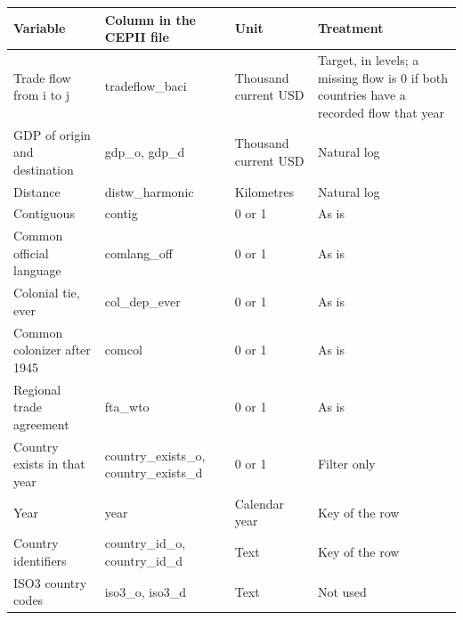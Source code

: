 \begin{tabular}{llll}
\toprule
Variable & Column in the CEPII file & Unit & Treatment \\
\midrule
Trade flow from i to j & tradeflow\_baci & Thousand current USD & Target, in levels; a missing flow is 0 if both countries have a recorded flow that year \\
GDP of origin and destination & gdp\_o, gdp\_d & Thousand current USD & Natural log \\
Distance & distw\_harmonic & Kilometres & Natural log \\
Contiguous & contig & 0 or 1 & As is \\
Common official language & comlang\_off & 0 or 1 & As is \\
Colonial tie, ever & col\_dep\_ever & 0 or 1 & As is \\
Common colonizer after 1945 & comcol & 0 or 1 & As is \\
Regional trade agreement & fta\_wto & 0 or 1 & As is \\
Country exists in that year & country\_exists\_o, country\_exists\_d & 0 or 1 & Filter only \\
Year & year & Calendar year & Key of the row \\
Country identifiers & country\_id\_o, country\_id\_d & Text & Key of the row \\
ISO3 country codes & iso3\_o, iso3\_d & Text & Not used \\
\bottomrule
\end{tabular}
